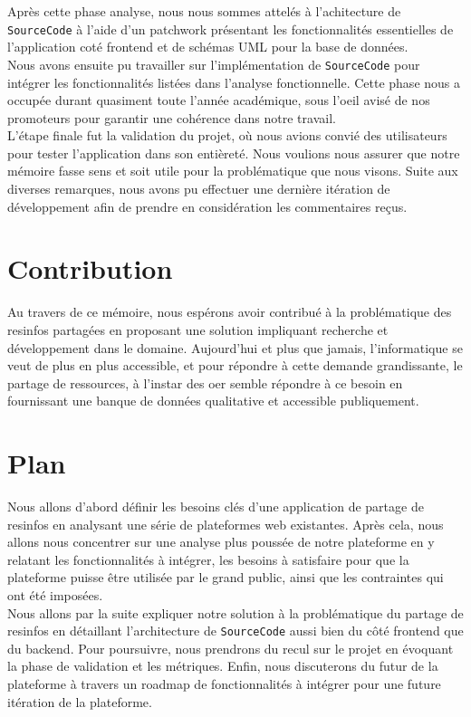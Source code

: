 Après cette phase analyse, nous nous sommes attelés à l'achitecture de \texttt{SourceCode} à l'aide d'un patchwork présentant les fonctionnalités essentielles de l'application coté \gls{frontend} et de schémas UML pour la base de données.\\

Nous avons ensuite pu travailler sur l'implémentation de \texttt{SourceCode} pour intégrer les fonctionnalités listées dans l'analyse fonctionnelle. Cette phase nous a occupée durant quasiment toute l'année académique, sous l'oeil avisé de nos promoteurs pour garantir une cohérence dans notre travail.\\

L'étape finale fut la validation du projet, où nous avions convié des utilisateurs pour tester l'application dans son entièreté. Nous voulions nous assurer que notre mémoire fasse sens et soit utile pour la problématique que nous visons. Suite aux diverses remarques, nous avons pu effectuer une dernière itération de développement afin de prendre en considération les commentaires reçus.

\section*{Contribution}

Au travers de ce mémoire, nous espérons avoir contribué à la problématique des \glspl{resinfo} partagées en proposant une solution impliquant recherche et développement dans le domaine. Aujourd’hui et plus que jamais, l'informatique se veut de plus en plus accessible, et pour répondre à cette demande grandissante, le partage de ressources, à l'instar des \gls{oer} semble répondre à ce besoin en fournissant une banque de données qualitative et accessible publiquement.

\section*{Plan}

Nous allons d'abord définir les besoins clés d'une application de partage de \glspl{resinfo} en analysant une série de plateformes web existantes.
Après cela, nous allons nous concentrer sur une analyse plus poussée de notre plateforme en y relatant les fonctionnalités à intégrer, les besoins à satisfaire pour que la plateforme puisse être utilisée par le grand public, ainsi que les contraintes qui ont été imposées.\\

Nous allons par la suite expliquer notre solution à la problématique du partage de \glspl{resinfo} en détaillant l'architecture de \texttt{SourceCode} aussi bien du côté \gls{frontend} que du \gls{backend}.
Pour poursuivre, nous prendrons du recul sur le projet en évoquant la phase de validation et les métriques. 
Enfin, nous discuterons du futur de la plateforme à travers un roadmap de fonctionnalités à intégrer pour une future itération de la plateforme.
